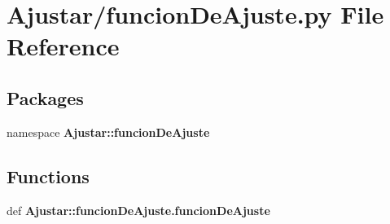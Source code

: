 \section{\-Ajustar/funcion\-De\-Ajuste.py \-File \-Reference}
\label{funcion_de_ajuste_8py}
\subsection*{\-Packages}
\begin{DoxyCompactItemize}
\item 
namespace {\bf \-Ajustar\-::funcion\-De\-Ajuste}
\end{DoxyCompactItemize}
\subsection*{\-Functions}
\begin{DoxyCompactItemize}
\item 
def {\bf \-Ajustar\-::funcion\-De\-Ajuste.\-funcion\-De\-Ajuste}
\end{DoxyCompactItemize}
